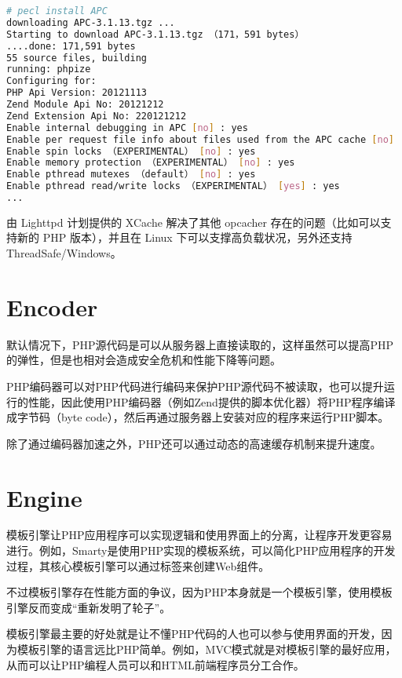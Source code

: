 \begin{lstlisting}[language=bash]
# pecl install APC
downloading APC-3.1.13.tgz ...
Starting to download APC-3.1.13.tgz （171，591 bytes）
....done: 171,591 bytes
55 source files, building
running: phpize
Configuring for:
PHP Api Version: 20121113
Zend Module Api No: 20121212
Zend Extension Api No: 220121212
Enable internal debugging in APC [no] : yes
Enable per request file info about files used from the APC cache [no] : yes
Enable spin locks （EXPERIMENTAL） [no] : yes
Enable memory protection （EXPERIMENTAL） [no] : yes
Enable pthread mutexes （default） [no] : yes
Enable pthread read/write locks （EXPERIMENTAL） [yes] : yes
...
\end{lstlisting}

由 Lighttpd 计划提供的 XCache 解决了其他 opcacher 存在的问题（比如可以支持新的 PHP 版本），并且在 Linux 下可以支撑高负载状况，另外还支持 ThreadSafe/Windows。






\section{Encoder}



默认情况下，PHP源代码是可以从服务器上直接读取的，这样虽然可以提高PHP的弹性，但是也相对会造成安全危机和性能下降等问题。

PHP编码器可以对PHP代码进行编码来保护PHP源代码不被读取，也可以提升运行的性能，因此使用PHP编码器（例如Zend提供的脚本优化器）将PHP程序编译成字节码（byte code），然后再通过服务器上安装对应的程序来运行PHP脚本。


除了通过编码器加速之外，PHP还可以通过动态的高速缓存机制来提升速度。





\section{Engine}

模板引擎让PHP应用程序可以实现逻辑和使用界面上的分离，让程序开发更容易进行。例如，Smarty是使用PHP实现的模板系统，可以简化PHP应用程序的开发过程，其核心模板引擎可以通过标签来创建Web组件。


不过模板引擎存在性能方面的争议，因为PHP本身就是一个模板引擎，使用模板引擎反而变成“重新发明了轮子”。

模板引擎最主要的好处就是让不懂PHP代码的人也可以参与使用界面的开发，因为模板引擎的语言远比PHP简单。例如，MVC模式就是对模板引擎的最好应用，从而可以让PHP编程人员可以和HTML前端程序员分工合作。



